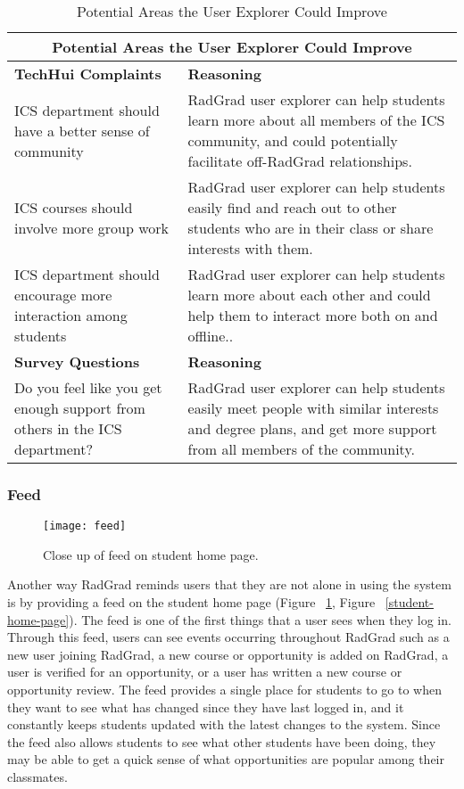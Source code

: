 \begin{table}[htbp!]
\centering
\begin{tabular}{  |p{4cm}|p{12cm}| } 
\hline
 \multicolumn{2}{|c|}{Potential Areas the User Explorer Could Improve}\\
  \hline
 \textbf{TechHui Complaints} & \textbf{Reasoning} \\ 
  \hline
  ICS department should have a better sense of community & RadGrad user explorer can help students learn more about all members of the ICS community, and could potentially facilitate off-RadGrad relationships.\\
  \hline
    ICS courses should involve more group work & RadGrad user explorer can help students easily find and reach out to other students who are in their class or share interests with them.\\
  \hline
  ICS department should encourage more interaction among students & RadGrad user explorer can help students learn more about each other and could help them to interact more both on and offline..\\
  \hline
 \textbf{Survey Questions} & \textbf{Reasoning} \\ 
  \hline
    Do you feel like you get enough support from others in the ICS department? & RadGrad user explorer can help students easily meet people with similar interests and degree plans, and get more support from all members of the community. \\
  \hline
\end{tabular}
 \caption{Potential Areas the User Explorer Could Improve}
\end{table}

\subsubsection{Feed}

\begin{figure}[htbp!]
\centering
\texttt{[image: feed]}
\caption{Close up of feed on student home page.}
\label{feed}
\end{figure}
Another way RadGrad reminds users that they are not alone in using the system is by providing a feed on the student home page (Figure ~\ref{feed}, Figure ~\ref{student-home-page}). The feed is one of the first things that a user sees when they log in. Through this feed, users can see events occurring throughout RadGrad such as a new user joining RadGrad, a new course or opportunity is added on RadGrad, a user is verified for an opportunity, or a user has written a new course or opportunity review. The feed provides a single place for students to go to when they want to see what has changed since they have last logged in, and it constantly keeps students updated with the latest changes to the system. Since the feed also allows students to see what other students have been doing, they may be able to get a quick sense of what opportunities are popular among their classmates.

